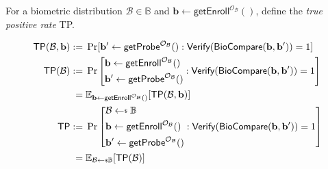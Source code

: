 \begin{definition}
For a biometric distribution $\mathcal{B} \in \mathbb{B}$ and $\mathbf{b} \gets \textsf{getEnroll}^{\mathcal{O}_\mathcal{B}}()$, define the \emph{true positive rate} \textsf{TP}.

\begin{align*}
	\textsf{TP}(\mathcal{B}, \mathbf{b}) 
	:=&\; \Pr[ \mathbf{b}^\prime \gets \textsf{getProbe}^{\mathcal{O}_\mathcal{B}}(): \textsf{Verify}(\textsf{BioCompare}(\mathbf{b}, \mathbf{b}^\prime )) = 1 ] \\
	\textsf{TP}(\mathcal{B}) 
	:=&\; \Pr \left[ 
		\begin{aligned}	
			& \mathbf{b} \gets \textsf{getEnroll}^{\mathcal{O}_\mathcal{B}}() \\
			& \mathbf{b}^\prime \gets \textsf{getProbe}^{\mathcal{O}_\mathcal{B}}()
		\end{aligned}
		: \textsf{Verify}(\textsf{BioCompare}(\mathbf{b}, \mathbf{b}^\prime)) = 1 \right] \\
	=&\; \mathbb{E}_{ \mathbf{b} \gets \textsf{getEnroll}^{\mathcal{O}_\mathcal{B}}() }[\textsf{TP}(\mathcal{B}, \mathbf{b})] \\
	\textsf{TP} 
	:=&\; \Pr \left[
		\begin{aligned}
			& \mathcal{B} \getsdollar \mathbb{B} \\
			& \mathbf{b} \gets \textsf{getEnroll}^{\mathcal{O}_\mathcal{B} }() \\
			& \mathbf{b}^\prime \gets \textsf{getProbe}^{\mathcal{O}_\mathcal{B} }()
		\end{aligned}
		: \textsf{Verify}(\textsf{BioCompare}(\mathbf{b}, \mathbf{b}^\prime )) = 1 \right] \\
	=&\; \mathbb{E}_{\mathcal{B} \getsdollar \mathbb{B}}[\textsf{TP}(\mathcal{B})] 
\end{align*}

\end{definition}


